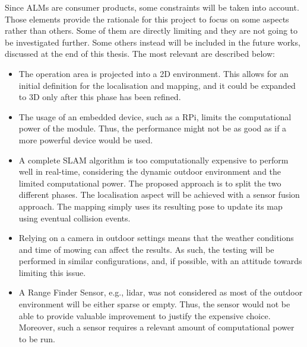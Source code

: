 Since \glspl{ALM} are consumer products, some constraints will be taken into account. %
Those elements provide the rationale for this project to focus on some aspects rather than others.
Some of them are directly limiting and they are not going to be investigated further.
Some others instead will be included in the future works, discussed at the end of this thesis.
The most relevant are described below:
\begin{itemize}
    \item The operation area is projected into a \Gls{2D} environment. This allows for an initial definition for the localisation and mapping, and it could be expanded to \gls{3D} only after this phase has been refined.  
    \item The usage of an embedded device, such as a \gls{RPi}, limits the computational power of the module. Thus, the performance might not be as good as if a more powerful device would be used. %
    \item A complete \gls{SLAM} algorithm is too computationally expensive to perform well in real-time, considering the dynamic outdoor environment and the limited computational power.
    The proposed approach is to split the two different phases.
    The localisation aspect will be achieved with a sensor fusion approach. The mapping simply uses its resulting pose to update its map using eventual collision events.%
    \item Relying on a camera in outdoor settings means that the weather conditions and time of mowing can affect the results.
    As such, the testing will be performed in similar configurations, and, if possible, with an attitude towards limiting this issue.
    \item A Range Finder Sensor, e.g., lidar, was not considered as most of the outdoor environment will be either sparse or empty.
    Thus, the sensor would not be able to provide valuable improvement to justify the expensive choice.
    Moreover, such a sensor requires a relevant amount of computational power to be run.
\end{itemize}


